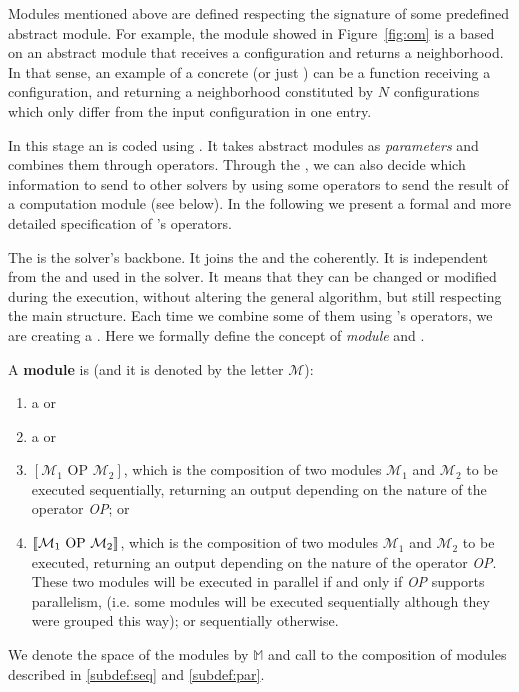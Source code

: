 Modules mentioned above are defined respecting the signature of some predefined abstract module. For example, the module showed in Figure~\ref{fig:om} is a \om{} based on an abstract module that receives a configuration and returns a neighborhood. In that sense, an example of a concrete \om{} (or just \om{}) can be a function receiving a configuration, and returning a neighborhood constituted by $N$ configurations which only differ from the input configuration in one entry.

In this stage an \as{} is coded using \posl{}. It takes abstract modules as {\it parameters} and combines them through operators. Through the \as, we can also decide which information to send to other solvers by using some operators to send the result of a computation module (see below). In the following we present a formal and more detailed specification of \posl{}'s operators. 


The \as{} is the solver's backbone. It joins the \oms{} and the \opchs{} coherently. It is independent from the \oms{} and \opchs{} used in the solver. It means that they can be changed or modified during the execution, without altering the general algorithm, but still respecting the main structure. Each time we combine some of them using \posl's operators, we are creating a \cm. Here we formally define the concept of \textit{module} and \cm.

\begin{definition}
	\label{def:module}
A {\bf module} is (and it is denoted by the letter $\mathcal{M}$):
\begin{enumerate}\renewcommand{\labelitemi}{\scriptsize$\blacksquare$}
\item a \om{} or
\item a \opch{} or
\item $\left[\mathcal{M}_1 \text{ OP } \mathcal{M}_2\right]$, which is the composition of two modules $\mathcal{M}_1$ and $\mathcal{M}_2$ to be executed sequentially, returning an output depending on the nature of the operator \emph{OP}; or\label{subdef:seq}
\item $\left\llbracket\mathcal{M}_1 \text{ OP } \mathcal{M}_2\right\rrbracket$, which is the composition of two modules $\mathcal{M}_1$ and $\mathcal{M}_2$ to be executed, returning an output depending on the nature of the operator \emph{OP}. These two modules will be executed in parallel if and only if \emph{OP} supports parallelism, (i.e. some modules will be executed sequentially although they were grouped this way); or sequentially otherwise.\label{subdef:par}
\end{enumerate}
We denote the space of the modules by $\mathbb{M}$ and call \cms{} to the composition of modules described in \ref{subdef:seq} and \ref{subdef:par}.
\end{definition}

